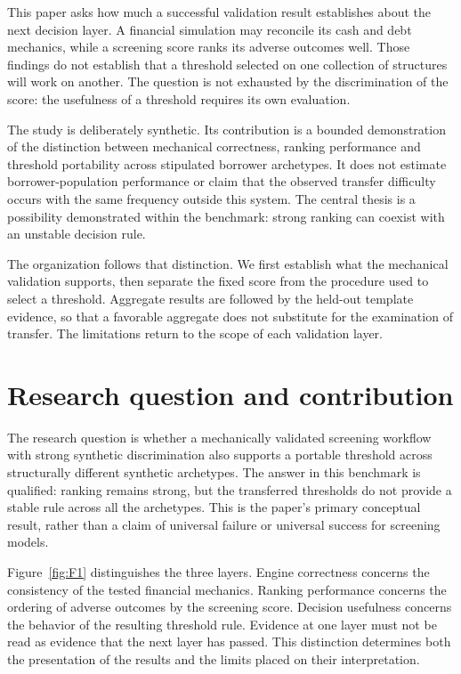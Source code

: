 \documentclass[11pt,a4paper]{article}
\begin{document}
This paper asks how much a successful validation result establishes about the next decision layer. A financial simulation may reconcile its cash and debt mechanics, while a screening score ranks its adverse outcomes well. Those findings do not establish that a threshold selected on one collection of structures will work on another. The question is not exhausted by the discrimination of the score: the usefulness of a threshold requires its own evaluation.

The study is deliberately synthetic. Its contribution is a bounded demonstration of the distinction between mechanical correctness, ranking performance and threshold portability across stipulated borrower archetypes. It does not estimate borrower-population performance or claim that the observed transfer difficulty occurs with the same frequency outside this system. The central thesis is a possibility demonstrated within the benchmark: strong ranking can coexist with an unstable decision rule.

The organization follows that distinction. We first establish what the mechanical validation supports, then separate the fixed score from the procedure used to select a threshold. Aggregate results are followed by the held-out template evidence, so that a favorable aggregate does not substitute for the examination of transfer. The limitations return to the scope of each validation layer.

\section{Research question and contribution}
The research question is whether a mechanically validated screening workflow with strong synthetic discrimination also supports a portable threshold across structurally different synthetic archetypes. The answer in this benchmark is qualified: ranking remains strong, but the transferred thresholds do not provide a stable rule across all the archetypes. This is the paper's primary conceptual result, rather than a claim of universal failure or universal success for screening models.

Figure~\ref{fig:F1} distinguishes the three layers. Engine correctness concerns the consistency of the tested financial mechanics. Ranking performance concerns the ordering of adverse outcomes by the screening score. Decision usefulness concerns the behavior of the resulting threshold rule. Evidence at one layer must not be read as evidence that the next layer has passed. This distinction determines both the presentation of the results and the limits placed on their interpretation.
\end{document}
